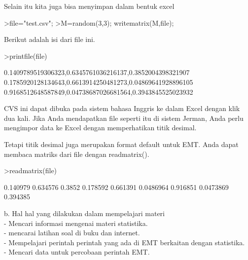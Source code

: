 \documentclass[a4paper,10pt]{article}
\begin{document}
\begin{eulernotebook}
\begin{eulercomment}
\begin{eulercomment}
\begin{eulercomment}
\begin{eulercomment}
\begin{eulercomment}
\begin{eulercomment}
\begin{eulercomment}
\begin{eulercomment}
\begin{eulercomment}
\begin{eulercomment}
\begin{eulercomment}
\begin{eulercomment}
\begin{euleroutput}
\end{euleroutput}
\begin{eulercomment}
Selain itu kita juga bisa menyimpan dalam bentuk excel
\end{eulercomment}
\begin{eulerprompt}
>file="test.csv";
>M=random(3,3); writematrix(M,file);
\end{eulerprompt}
\begin{eulercomment}
Berikut adalah isi dari file ini.
\end{eulercomment}
\begin{eulerprompt}
>printfile(file)
\end{eulerprompt}
\begin{euleroutput}
  0.1409789519306323,0.6345761036216137,0.3852004398321907
  0.1785920128134643,0.6613914250481273,0.04869641928896105
  0.9168512648587849,0.04738687026681564,0.3943845525023932
  
\end{euleroutput}
\begin{eulercomment}
CVS ini dapat dibuka pada sistem bahasa Inggris ke dalam Excel dengan
klik dua kali. Jika Anda mendapatkan file seperti itu di sistem
Jerman, Anda perlu mengimpor data ke Excel dengan memperhatikan titik
desimal.

Tetapi titik desimal juga merupakan format default untuk EMT. Anda
dapat membaca matriks dari file dengan readmatrix().
\end{eulercomment}
\begin{eulerprompt}
>readmatrix(file)
\end{eulerprompt}
\begin{euleroutput}
       0.140979      0.634576        0.3852 
       0.178592      0.661391     0.0486964 
       0.916851     0.0473869      0.394385 
\end{euleroutput}
\begin{eulercomment}
b. Hal hal yang dilakukan dalam mempelajari materi\\
- Mencari informasi mengenai materi statistika.\\
- mencarai latihan soal di buku dan internet.\\
- Mempelajari perintah perintah yang ada di EMT berkaitan dengan
statistika.\\
- Mencari data untuk percobaan perintah EMT.


\end{eulercomment}
\end{eulercomment}
\end{eulercomment}
\end{eulercomment}
\end{eulercomment}
\end{eulercomment}
\end{eulercomment}
\end{eulercomment}
\end{eulercomment}
\end{eulercomment}
\end{eulercomment}
\end{eulercomment}
\end{eulercomment}
\end{eulernotebook}
\end{document}
